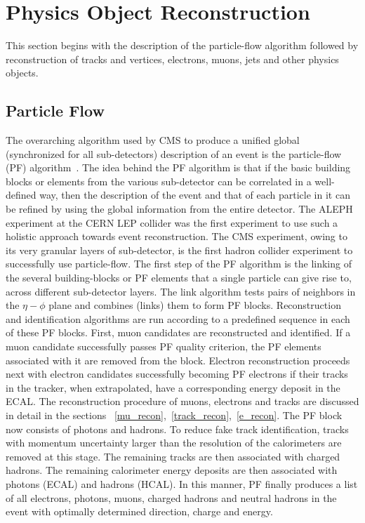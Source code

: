 \section{Physics Object Reconstruction}
\label{p_ob_recon}
This section begins with the description of the particle-flow algorithm followed by reconstruction of tracks and vertices, electrons, muons, jets and other physics objects.  
\subsection{Particle Flow}
\label{p_flow}
The overarching algorithm used by CMS to produce a unified global (synchronized for all sub-detectors) description of an event is the particle-flow (PF) algorithm~\cite{Sirunyan:2017ulk}. The idea behind the PF algorithm is that if the basic building blocks or elements from the various sub-detector can be correlated in a well-defined way, then the description of the event and that of each particle in it can be refined by using the global information from the entire detector. The ALEPH experiment at the CERN LEP collider was the first experiment to use such a holistic approach towards event reconstruction. The CMS experiment, owing to its very  granular layers of sub-detector, is the first hadron collider experiment to successfully use particle-flow. The first step of the PF algorithm is the linking of the several building-blocks or PF elements that a single particle can give rise to, across different sub-detector layers. The link algorithm tests pairs of neighbors in the $\eta-\phi$ plane and combines (links) them to form PF blocks. Reconstruction and identification algorithms are run according to a predefined sequence in each of these PF blocks. First, muon candidates are reconstructed and identified. If a muon candidate successfully passes PF quality criterion, the PF elements associated with it are removed from the block. Electron reconstruction proceeds next with electron candidates successfully becoming PF electrons  if their tracks in the tracker, when extrapolated,  have a corresponding energy deposit in the ECAL. The reconstruction procedure of muons, electrons and tracks are discussed in detail in the sections ~\ref{mu_recon},~\ref{track_recon},~\ref{e_recon}. The PF block now consists of photons and hadrons. To reduce fake track identification, tracks with momentum uncertainty larger than the resolution of the calorimeters are removed at this stage. The remaining tracks are then associated with charged hadrons. The remaining calorimeter energy deposits are then associated with photons (ECAL) and hadrons (HCAL). In this manner, PF finally produces a list of all electrons, photons, muons, charged hadrons and neutral hadrons in the event with optimally determined direction, charge and energy.          



